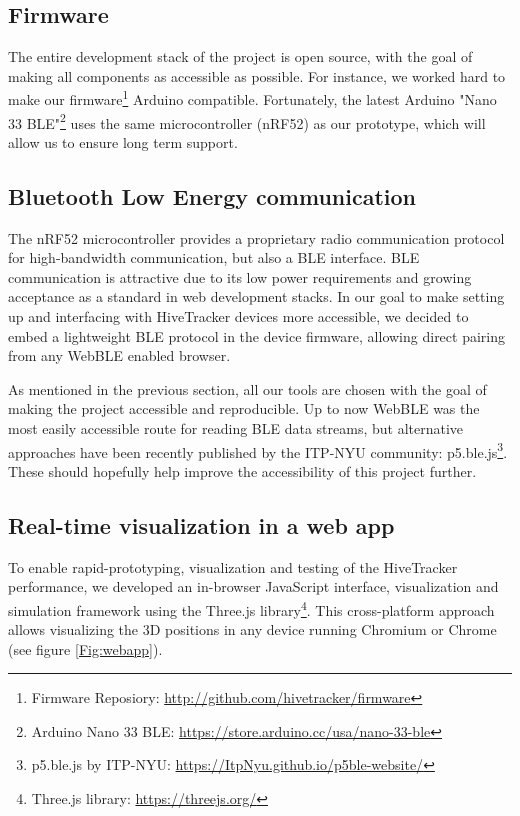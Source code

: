 \documentclass[sigchi]{acmart}
\begin{document}
\subsection{Firmware}

The entire development stack of the project is open source, with the goal of making all components as accessible as possible. For instance, we worked hard to make our firmware\footnote{Firmware Reposiory: \url{http://github.com/hivetracker/firmware}} Arduino compatible. Fortunately, the latest
Arduino "Nano 33 BLE"\footnote{Arduino Nano 33 BLE: \url{https://store.arduino.cc/usa/nano-33-ble}} uses the same microcontroller (nRF52) as our prototype, which will allow us to ensure long term support.

\subsection{Bluetooth Low Energy communication}

The nRF52 microcontroller provides a proprietary radio communication protocol for high-bandwidth communication, but also a BLE interface. BLE communication is attractive due to its low power requirements and growing acceptance as a standard in web development stacks. In our goal to make setting up and interfacing with HiveTracker devices more accessible, we decided to embed a lightweight BLE protocol in the device firmware, allowing direct pairing from any WebBLE enabled browser.

As mentioned in the previous section, all our tools are chosen with the goal of making the project accessible and reproducible. Up to now WebBLE was the most easily accessible route for reading BLE data streams, but alternative approaches have been recently published by the ITP-NYU community: p5.ble.js\footnote{p5.ble.js by ITP-NYU: \url{https://ItpNyu.github.io/p5ble-website/}}. These should hopefully help improve the accessibility of this project further.


\subsection{Real-time visualization in a web app}

To enable rapid-prototyping, visualization and testing of the HiveTracker performance, we developed an in-browser JavaScript interface, visualization and simulation framework using the Three.js library\footnote{Three.js library: \url{https://threejs.org/}}. This cross-platform approach allows visualizing the 3D positions in any device running Chromium or Chrome (see figure \ref{Fig:webapp}).
\end{document}

